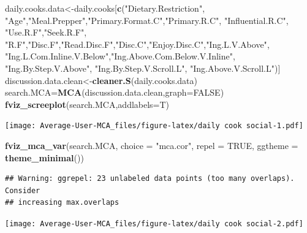 \documentclass[
]{article}
\newenvironment{Shaded}{\begin{snugshade}}{\end{snugshade}}
\newcommand{\DataTypeTok}[1]{\textcolor[rgb]{0.13,0.29,0.53}{#1}}
\newcommand{\KeywordTok}[1]{\textcolor[rgb]{0.13,0.29,0.53}{\textbf{#1}}}
\newcommand{\NormalTok}[1]{#1}
\newcommand{\OtherTok}[1]{\textcolor[rgb]{0.56,0.35,0.01}{#1}}
\newcommand{\StringTok}[1]{\textcolor[rgb]{0.31,0.60,0.02}{#1}}
\begin{document}
\begin{Shaded}
\begin{Highlighting}[]
\NormalTok{daily.cooks.data<-daily.cooks[}\KeywordTok{c}\NormalTok{(}\StringTok{"Dietary.Restriction"}\NormalTok{, }\StringTok{"Age"}\NormalTok{,}\StringTok{"Meal.Prepper"}\NormalTok{,}\StringTok{"Primary.Format.C"}\NormalTok{,}\StringTok{"Primary.R.C"}\NormalTok{, }\StringTok{"Influential.R.C"}\NormalTok{, }
            \StringTok{"Use.R.F"}\NormalTok{,}\StringTok{"Seek.R.F"}\NormalTok{, }\StringTok{"R.F"}\NormalTok{,}\StringTok{"Disc.F"}\NormalTok{,}\StringTok{"Read.Disc.F"}\NormalTok{,}\StringTok{"Disc.C"}\NormalTok{,}\StringTok{"Enjoy.Disc.C"}\NormalTok{,}\StringTok{"Ing.L.V.Above"}\NormalTok{,}
            \StringTok{"Ing.L.Com.Inline.V.Below"}\NormalTok{,}\StringTok{"Ing.Above.Com.Below.V.Inline"}\NormalTok{,  }\StringTok{"Ing.By.Step.V.Above"}\NormalTok{,  }\StringTok{"Ing.By.Step.V.Scroll.L"}\NormalTok{,}
            \StringTok{"Ing.Above.V.Scroll.L"}\NormalTok{)]}
\NormalTok{discussion.data.clean<-}\KeywordTok{cleaner.S}\NormalTok{(daily.cooks.data)}
\NormalTok{search.MCA=}\KeywordTok{MCA}\NormalTok{(discussion.data.clean,}\DataTypeTok{graph=}\OtherTok{FALSE}\NormalTok{)}
\KeywordTok{fviz_screeplot}\NormalTok{(search.MCA,}\DataTypeTok{addlabels=}\NormalTok{T)}
\end{Highlighting}
\end{Shaded}

\texttt{[image: Average-User-MCA\_files/figure-latex/daily cook social-1.pdf]}

\begin{Shaded}
\begin{Highlighting}[]
\KeywordTok{fviz_mca_var}\NormalTok{(search.MCA, }\DataTypeTok{choice =} \StringTok{"mca.cor"}\NormalTok{, }\DataTypeTok{repel =} \OtherTok{TRUE}\NormalTok{,}
             \DataTypeTok{ggtheme =} \KeywordTok{theme_minimal}\NormalTok{())}
\end{Highlighting}
\end{Shaded}

\begin{verbatim}
## Warning: ggrepel: 23 unlabeled data points (too many overlaps). Consider
## increasing max.overlaps
\end{verbatim}

\texttt{[image: Average-User-MCA\_files/figure-latex/daily cook social-2.pdf]}

\begin{Shaded}
\end{Shaded}
\end{document}
